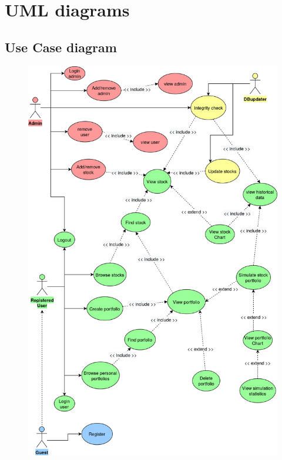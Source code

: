 \chapter{UML diagrams}
\section{Use Case diagram}
\begin{figure}[H]
	\begin{center}
		\includegraphics[scale=0.22]{img/use_case.jpg}
	\end{center}
\end{figure}
\restoregeometry
